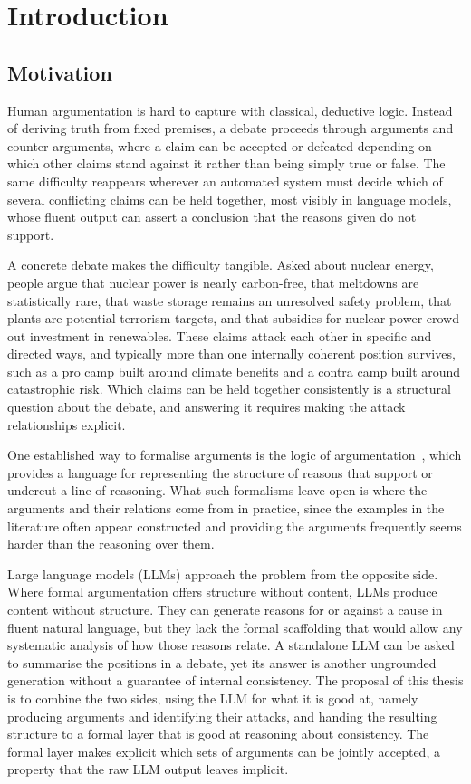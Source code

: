 %
\chapter{Introduction}
\label{sec:intro}

\section{Motivation}
\label{sec:intro:motivation}

Human argumentation is hard to capture with classical, deductive logic.
Instead of deriving truth from fixed premises, a debate proceeds
through arguments and counter-arguments, where a claim can be accepted or
defeated depending on which other claims stand against it rather than being
simply true or false. The same difficulty reappears wherever an automated
system must decide which of several conflicting claims can be held together,
most visibly in language models, whose fluent output can assert a conclusion
that the reasons given do not support.

A concrete debate makes the difficulty tangible. Asked about nuclear energy,
people argue that nuclear power is nearly carbon-free, that meltdowns are
statistically rare, that waste storage remains an unresolved safety problem,
that plants are potential terrorism targets, and that subsidies for nuclear
power crowd out investment in renewables. These claims attack
each other in specific and directed ways, and typically more than one
internally coherent position survives, such as a pro camp built around climate
benefits and a contra camp built around catastrophic risk. Which claims can be
held together consistently is a structural question about the debate, and
answering it requires making the attack relationships explicit.

One established way to formalise arguments is the logic of
argumentation~\cite{krause1995logic}, which provides a language for representing
the structure of reasons that support or undercut a line of reasoning. What
such formalisms leave open is where the arguments and their relations come
from in practice, since the examples in the literature often appear
constructed and providing the arguments frequently seems harder than the
reasoning over them.

Large language models (LLMs) approach the problem from the opposite side. Where
formal argumentation offers structure without content, LLMs produce content
without structure. They can generate reasons for or against a cause in fluent
natural language, but they lack the formal scaffolding that would allow any
systematic analysis of how those reasons relate. A standalone LLM can be asked
to summarise the positions in a debate, yet its answer is another ungrounded
generation without a guarantee of internal consistency. The proposal of this
thesis is to combine the two sides, using the LLM for what it is good at,
namely producing arguments and identifying their attacks, and handing the
resulting structure to a formal layer that is good at reasoning about
consistency. The formal layer makes explicit which sets of arguments can be jointly
accepted, a property that the raw LLM output leaves implicit.

